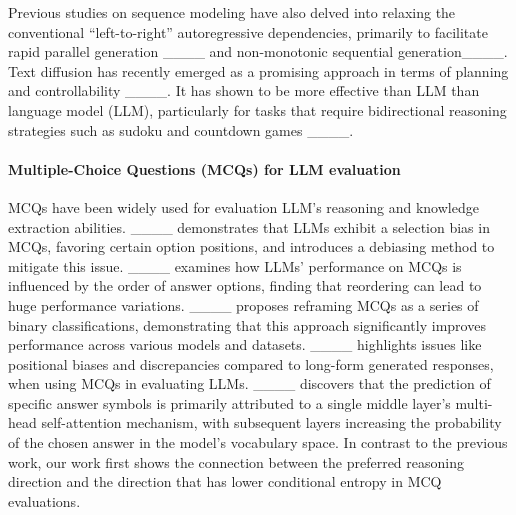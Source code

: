 Previous studies on sequence modeling have also delved into relaxing the conventional ``left-to-right'' autoregressive dependencies, primarily to facilitate rapid parallel generation ____ and non-monotonic sequential generation____. Text diffusion has recently emerged as a promising approach in terms of planning and controllability ____. It has shown to be more effective than LLM than language model (LLM), particularly for tasks that require bidirectional reasoning strategies such as sudoku and countdown games ____.


\paragraph{Multiple-Choice Questions (MCQs) for LLM evaluation}
MCQs have been widely used for evaluation LLM's reasoning and knowledge extraction abilities. 
____ demonstrates that LLMs exhibit a selection bias in MCQs, favoring certain option positions, and introduces a debiasing method to mitigate this issue.
____ examines how LLMs’ performance on MCQs is influenced by the order of answer options, finding that reordering can lead to huge performance variations. 
____ proposes reframing MCQs as a series of binary classifications, demonstrating that this approach significantly improves performance across various models and datasets.
____ highlights issues like positional biases and discrepancies compared to long-form generated responses, when using MCQs in evaluating LLMs.
____ discovers that the prediction of specific answer symbols is primarily attributed to a single middle layer’s multi-head self-attention mechanism, with subsequent layers increasing the probability of the chosen answer in the model’s vocabulary space.
In contrast to the previous work, our work first shows the connection between the preferred reasoning direction and the direction that has lower conditional entropy in MCQ evaluations.